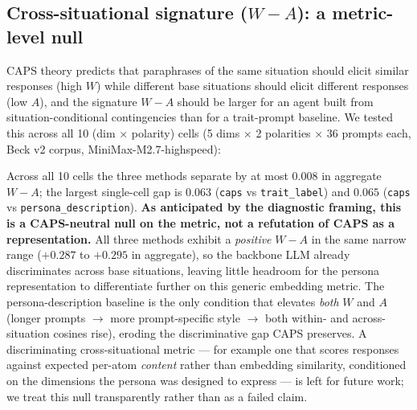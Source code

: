 \subsection{Cross-situational signature ($W - A$): a metric-level null}
\label{app:B.1}

CAPS theory predicts that paraphrases of the same situation should elicit similar responses (high $W$) while different base situations should elicit different responses (low $A$), and the signature $W - A$ should be larger for an agent built from situation-conditional contingencies than for a trait-prompt baseline. We tested this across all 10 (dim $\times$ polarity) cells (5 dims $\times$ 2 polarities $\times$ 36 prompts each, Beck v2 corpus, MiniMax-M2.7-highspeed):

\begin{table}[t]
\centering
{}
\caption{Cross-situational signature ($W{-}A$) on three persona conditions across all 10 (dim $\times$ polarity) cells. The three methods separate by at most $0.008$ in aggregate on this generic embedding metric; reported transparently as a CAPS-neutral metric-level null.}
\label{tab:wma-null}
\end{table}

Across all 10 cells the three methods separate by at most $0.008$ in aggregate $W - A$; the largest single-cell gap is $0.063$ (\texttt{caps} vs \texttt{trait\_\allowbreak{}label}) and $0.065$ (\texttt{caps} vs \texttt{persona\_\allowbreak{}description}). \textbf{As anticipated by the diagnostic framing, this is a CAPS-neutral null on the metric, not a refutation of CAPS as a representation.} All three methods exhibit a \textit{positive} $W - A$ in the same narrow range ($+0.287$ to $+0.295$ in aggregate), so the backbone LLM already discriminates across base situations, leaving little headroom for the persona representation to differentiate further on this generic embedding metric. The persona-description baseline is the only condition that elevates \textit{both} $W$ and $A$ (longer prompts $\to$ more prompt-specific style $\to$ both within- and across-situation cosines rise), eroding the discriminative gap CAPS preserves. A discriminating cross-situational metric --- for example one that scores responses against expected per-atom \textit{content} rather than embedding similarity, conditioned on the dimensions the persona was designed to express --- is left for future work; we treat this null transparently rather than as a failed claim.

